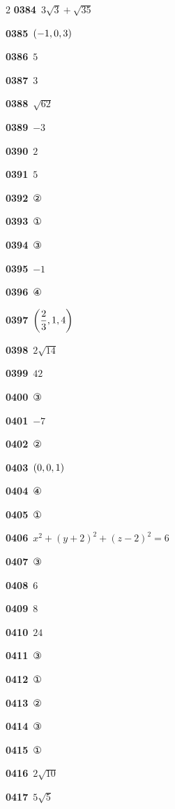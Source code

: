 \documentclass[10pt,a4paper]{article}
\begin{document}
\begin{multicols}{2}
\noindent\textbf{0384}\ $3\sqrt{3}+\sqrt{35}$\par
\noindent\textbf{0385}\ $(-1{,}\mkern3mu\mathopen{}0{,}\mkern3mu\mathopen{}3)$\par
\noindent\textbf{0386}\ $5$\par
\noindent\textbf{0387}\ $3$\par
\noindent\textbf{0388}\ $\sqrt{62}$\par
\noindent\textbf{0389}\ $-3$\par
\noindent\textbf{0390}\ $2$\par
\noindent\textbf{0391}\ $5$\par
\noindent\textbf{0392}\ ②\par
\noindent\textbf{0393}\ ①\par
\noindent\textbf{0394}\ ③\par
\noindent\textbf{0395}\ $-1$\par
\noindent\textbf{0396}\ ④\par
\noindent\textbf{0397}\ $\left(\dfrac{2}{3}{,}\mkern3mu\mathopen{}1{,}\mkern3mu\mathopen{}4\right)$\par
\noindent\textbf{0398}\ $2\sqrt{14}$\par
\noindent\textbf{0399}\ $42$\par
\noindent\textbf{0400}\ ③\par
\noindent\textbf{0401}\ $-7$\par
\noindent\textbf{0402}\ ②\par
\noindent\textbf{0403}\ $(0{,}\mkern3mu\mathopen{}0{,}\mkern3mu\mathopen{}1)$\par
\noindent\textbf{0404}\ ④\par
\noindent\textbf{0405}\ ①\par
\noindent\textbf{0406}\ $x^2+(y+2)^2+(z-2)^2=6$\par
\noindent\textbf{0407}\ ③\par
\noindent\textbf{0408}\ $6$\par
\noindent\textbf{0409}\ $8$\par
\noindent\textbf{0410}\ $24$\par
\noindent\textbf{0411}\ ③\par
\noindent\textbf{0412}\ ①\par
\noindent\textbf{0413}\ ②\par
\noindent\textbf{0414}\ ③\par
\noindent\textbf{0415}\ ①\par
\noindent\textbf{0416}\ $2\sqrt{10}$\par
\noindent\textbf{0417}\ $5\sqrt{5}$\par

\end{multicols}
\end{document}
